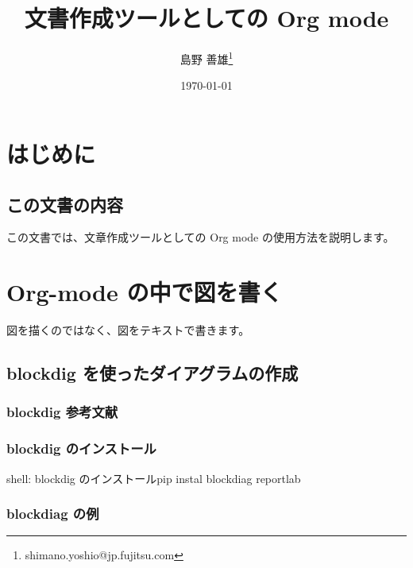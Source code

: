\documentclass[a4j,12pt,openany,uplatex,dvipdfmx]{jsbook}
\author{島野 善雄\thanks{shimano.yoshio@jp.fujitsu.com}}
\date{\today}
\title{文書作成ツールとしての Org mode}
\begin{document}
\maketitle
\setcounter{tocdepth}{4}
\tableofcontents

\listoffigures
\listoftables

\mainmatter


\chapter{はじめに}
\label{sec:orgc5ecff6}
\section{この文書の内容}
\label{sec:orgc5e82c0}
この文書では、文章作成ツールとしての Org mode の使用方法を説明します。



\chapter{Org-mode の中で図を書く}
\label{sec:orgc8b128c}

図を描くのではなく、図をテキストで書きます。



\section{blockdig を使ったダイアグラムの作成}
\label{sec:orgde8a648}

\subsection{blockdig 参考文献}
\label{sec:org42f7b09}



\subsection{blockdig のインストール}
\label{sec:org57e2fd4}

\begin{programlist}[label={code: install-blockdiag}]{shell}{: blockdig のインストール}pip instal blockdiag reportlab 
\end{programlist}



\subsection{blockdiag の例}
\label{sec:org731ae03}
\end{document}
